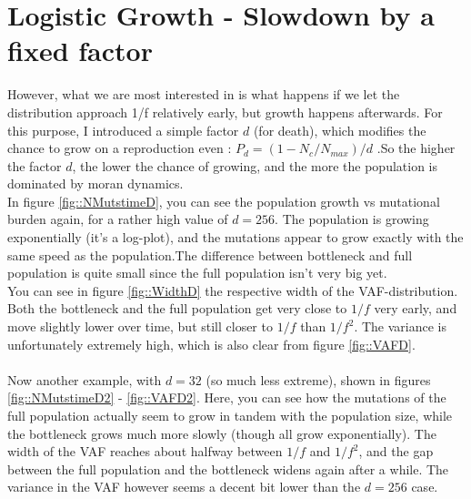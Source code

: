 \documentclass{article}
\numberwithin{equation}{subsection}
\begin{document}
		
	\FloatBarrier
	
	\section{Logistic Growth - Slowdown by a fixed factor}
	
	However, what we are most interested in is what happens if we let the distribution approach 1/f relatively early, but growth happens afterwards. For this purpose, I introduced a simple factor $ d $ (for death), which modifies the chance to grow on a reproduction even : $ P_d = (1-N_c/N_{max})/d$ .So the higher the factor $ d $, the lower the chance of growing, and the more the population is dominated by moran dynamics.\\
	In figure \ref{fig::NMutstimeD}, you can see the population growth vs mutational burden again, for a rather high value of $ d = 256 $. The population is growing exponentially (it's a log-plot), and the mutations appear to grow exactly with the same speed as the population.The difference between bottleneck and full population is quite small since the full population isn't very big yet.\\
	You can see in figure \ref{fig::WidthD} the respective width of the VAF-distribution. Both the bottleneck and the full population get very close to $ 1/f $ very early, and move slightly lower over time, but still closer to $ 1/f$ than $ 1/f^2 $. The variance is unfortunately extremely high, which is also clear from figure \ref{fig::VAFD}.\\
	\\
	Now another example, with $ d = 32 $ (so much less extreme), shown in figures \ref{fig::NMutstimeD2} - \ref{fig::VAFD2}. Here, you can see how the mutations of the full population actually seem to grow in tandem with the population size, while the bottleneck grows much more slowly (though all grow exponentially). The width of the VAF reaches about halfway between $ 1/f $ and $ 1/f^2$, and the gap between the full population and the bottleneck widens again after a while. The variance in the VAF however seems a decent bit lower than the $d = 256 $ case.
	
\end{document}
